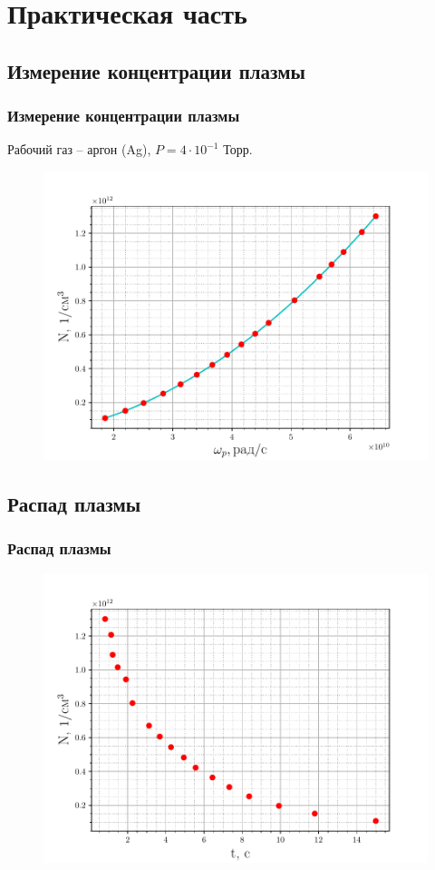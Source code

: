 \documentclass[10pt,pdf,hyperref={unicode}, dvipsnames]{beamer}
\begin{document}
\section{Практическая часть} %
\subsection{Измерение концентрации плазмы}
\begin{frame}
	\frametitle{Измерение концентрации плазмы}
	Рабочий газ -- аргон (Ag), 
	$P=4\cdot10^{-1}$ Торр. 
	\begin{figure}[tb]
		\vspace{-5pt}
		\centering
		\includegraphics[width=0.89\linewidth]{fig/concentration}
		\label{fig:1}
	\end{figure}
\end{frame}
\subsection{Распад  плазмы}
\begin{frame}
	\frametitle{Распад плазмы}
	\begin{figure}[tb]
		\centering
		\includegraphics[width=0.9\linewidth]{fig/decay}
		\label{fig:2}
	\end{figure}
\end{frame}
\end{document}
